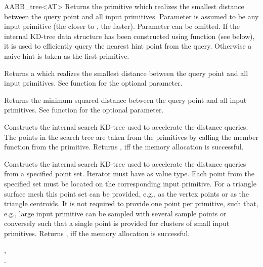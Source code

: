 \begin{ccRefClass}{AABB_tree<AT>}
{Returns the primitive which realizes the smallest distance between the query point and all input primitives. Parameter  is assumed to be any input primitive (the closer  to , the faster). Parameter  can be omitted. If the internal KD-tree data structure has been constructed using function  (see below), it is used to efficiently query the nearest hint point from the query. Otherwise a naive hint is taken as the first primitive. }

{Returns a  which realizes the smallest distance between the query point and all input primitives. See  function for the optional  parameter. }

{Returns the minimum squared distance between the query point and all input primitives. See  function for the optional  parameter. }



{ Constructs the internal search KD-tree used to accelerate the distance queries. The points in the search tree are taken from the primitives by calling the member function  from the primitive. Returns , iff the memory allocation is successful.}

\begin{ccAdvanced}
{ Constructs the internal search KD-tree used to accelerate the distance queries from a specified point set. Iterator  must have  as value type. Each point from the specified  set must be located on the corresponding input primitive. For a triangle surface mesh this point set can be provided, e.g., as the vertex points or as the triangle centroids. It is not required to provide one point per primitive, such that, e.g., large input primitive can be sampled with several sample points or conversely such that a single point is provided for clusters of small input primitives. Returns , iff the memory allocation is successful.}
\end{ccAdvanced}

\ccSeeAlso

, \\
.

\end{ccRefClass}

\ccRefPageEnd

